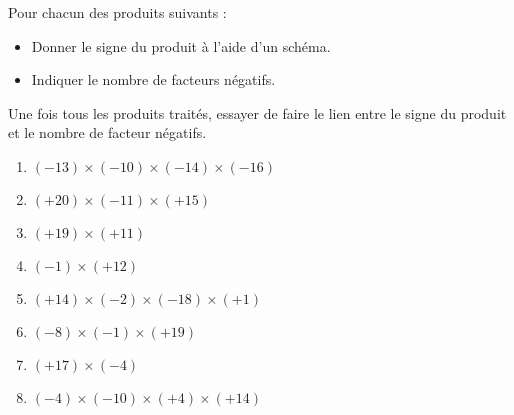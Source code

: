 \begin{exercice*}
    Pour chacun des produits suivants :
    \begin{itemize}
        \item Donner le signe du produit à l'aide d'un schéma.
        \item Indiquer le nombre de facteurs négatifs.
    \end{itemize}
    Une fois tous les produits traités, essayer de faire le lien entre le signe du produit et le nombre de facteur négatifs.
    \begin{enumerate}
            \item $ (-13) \times (-10) \times (-14) \times (-16) $
            \item $ (+20) \times (-11) \times (+15) $
            \item $ (+19) \times (+11) $
            \item $ (-1) \times (+12) $
            \item $ (+14) \times (-2) \times (-18) \times (+1) $
            \item $ (-8) \times (-1) \times (+19) $
            \item $ (+17) \times (-4) $
            \item $ (-4) \times (-10) \times (+4) \times (+14) $
        \end{enumerate}
    
\end{exercice*}
